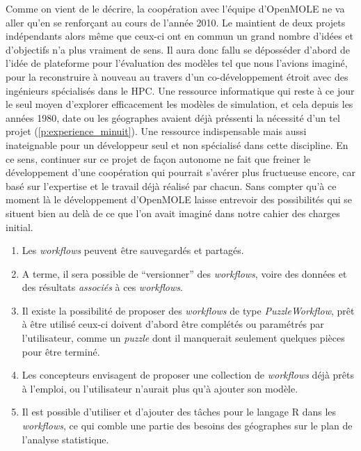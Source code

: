 
Comme on vient de le décrire, la coopération avec l'équipe d'OpenMOLE ne va aller qu'en se renforçant au cours de l'année 2010. Le maintient de deux projets indépendants alors même que ceux-ci ont en commun un grand nombre d'idées et d'objectifs n'a plus vraiment de sens. Il aura donc fallu se déposséder d'abord de l'idée de plateforme pour l'évaluation des modèles tel que nous l'avions imaginé, pour la reconstruire à nouveau au travers d'un co-développement étroit avec des ingénieurs spécialisés dans le HPC. Une ressource informatique qui reste à ce jour le seul moyen d'explorer efficacement les modèles de simulation, et cela depuis les années 1980, date ou les géographes avaient déjà préssenti la nécessité d'un tel projet (\ref{p:experience_minuit}). Une ressource indispensable mais aussi inateignable pour un développeur seul et non spécialisé dans cette discipline. En ce sens, continuer sur ce projet de façon autonome ne fait que freiner le développement d'une coopération qui pourrait s'avérer plus fructueuse encore, car basé sur l'expertise et le travail déjà réalisé par chacun. Sans compter qu'à ce moment là le développement d'OpenMOLE laisse entrevoir des possibilités qui se situent bien au delà de ce que l'on avait imaginé dans notre cahier des charges initial.

\begin{enumerate}[label=(\alph*),labelindent=\parindent,leftmargin=*]
\item Les \textit{workflows} peuvent être sauvegardés et partagés.
\item A terme, il sera possible de \enquote{versionner}  des \textit{workflows}, voire des données et des résultats \textit{associés} à ces \textit{workflows}.
\item Il existe la possibilité de proposer des \textit{workflows} de type \textit{PuzzleWorkflow}, prêt à être utilisé ceux-ci doivent d'abord être complétés ou paramétrés par l'utilisateur, comme un \textit{puzzle} dont il manquerait seulement quelques pièces pour être terminé. 
\item Les concepteurs envisagent de proposer une collection de \textit{workflows} déjà prêts à l'emploi, ou l'utilisateur n'aurait plus qu'à ajouter son modèle. 
\item Il est possible d'utiliser et d'ajouter des tâches pour le langage R dans les \textit{workflows}, ce qui comble une partie des besoins des géographes sur le plan de l'analyse statistique.
\end{enumerate}

